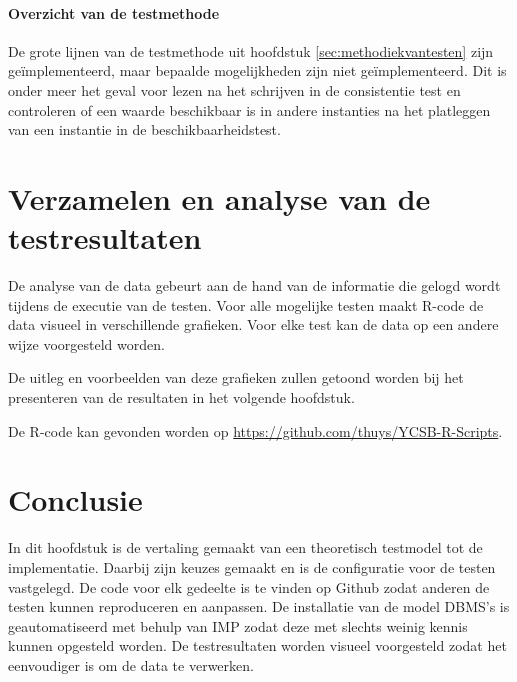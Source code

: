 \paragraph{Overzicht van de testmethode} De grote lijnen van de testmethode uit hoofdstuk \ref{sec:methodiekvantesten} zijn geïmplementeerd, maar bepaalde mogelijkheden zijn niet geïmplementeerd. Dit is onder meer het geval voor lezen na het schrijven in de consistentie test en controleren of een waarde beschikbaar is in andere instanties na het platleggen van een instantie in de beschikbaarheidstest. 

\section{Verzamelen en analyse van de testresultaten}
De analyse van de data gebeurt aan de hand van de informatie die gelogd wordt tijdens de executie van de testen. Voor alle mogelijke testen maakt R-code de data visueel in verschillende grafieken. Voor elke test kan de data op een andere wijze voorgesteld worden. 

De uitleg en voorbeelden van deze grafieken zullen getoond worden bij het presenteren van de resultaten in het volgende hoofdstuk. 

De R-code kan gevonden worden op \url{https://github.com/thuys/YCSB-R-Scripts}.  

\section{Conclusie}
In dit hoofdstuk is de vertaling gemaakt van een theoretisch testmodel tot de implementatie. Daarbij zijn keuzes gemaakt en is de configuratie voor de testen vastgelegd. De code voor elk gedeelte is te vinden op Github zodat anderen de testen kunnen reproduceren en aanpassen. De installatie van de model DBMS's is geautomatiseerd met behulp van IMP zodat deze met slechts weinig kennis kunnen opgesteld worden. De testresultaten worden visueel voorgesteld zodat het eenvoudiger is om de data te verwerken. 

%
